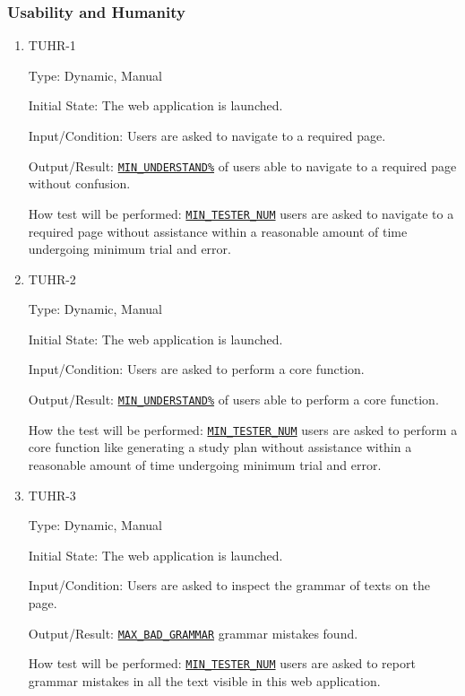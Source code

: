 \documentclass[12pt, titlepage]{article}
\begin{document}
\subsubsection{Usability and Humanity}

\begin{enumerate}
\item{TUHR-1\\}\label{TUHR-1}

Type: Dynamic, Manual
					
Initial State: The web application is launched.
					
Input/Condition: Users are asked to navigate to a required page.
					
Output/Result: \hyperref[MIN_UNDERSTAND]{\texttt{MIN\_UNDERSTAND\%}} of users able to navigate to a required page without confusion.
					
How test will be performed: \hyperref[MIN_TESTER_NUM]{\texttt{MIN\_TESTER\_NUM}} users are asked to navigate to a required page without assistance within a reasonable amount of time undergoing minimum trial and error.

\item{TUHR-2\\}\label{TUHR-2}

Type: Dynamic, Manual
					
Initial State: The web application is launched.
					
Input/Condition: Users are asked to perform a core function.
					
Output/Result: \hyperref[MIN_UNDERSTAND]{\texttt{MIN\_UNDERSTAND\%}} of users able to perform a core function.
					
How the test will be performed: \hyperref[MIN_TESTER_NUM]{\texttt{MIN\_TESTER\_NUM}} users are asked to perform a core function like generating a study plan without assistance within a reasonable amount of time undergoing minimum trial and error.
\item{TUHR-3\\}\label{TUHR-3}

Type: Dynamic, Manual
					
Initial State: The web application is launched.
					
Input/Condition: Users are asked to inspect the grammar of texts on the page.
					
Output/Result: \hyperref[MAX_BAD_GRAMMAR]{\texttt{MAX\_BAD\_GRAMMAR}} grammar mistakes found.
					
How test will be performed: \hyperref[MIN_TESTER_NUM]{\texttt{MIN\_TESTER\_NUM}} users are asked to report grammar mistakes in all the text visible in this web application.


\end{enumerate}
\end{document}
